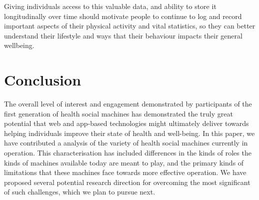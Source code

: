 \documentclass{sig-alternate}
\begin{document}
Giving individuals access to this valuable data, and ability to store
it longitudinally over time should motivate people to continue to log
and record important aspects of their physical activity and vital
statistics, so they can better understand their lifestyle and ways that
their behaviour impacts their general wellbeing.

\section{Conclusion}

The overall level of interest and engagement demonstrated by
participants of the first generation of health social machines has
demonstrated the truly great potential that web and app-based
technologies might ultimately deliver towards helping individuals
improve their state of health and well-being. In this paper, we have
contributed a analysis of the variety of health social machines
currently in operation.  This characterisation has included
differences in the kinds of roles the kinds of machines available
today are meant to play, and the primary kinds of limitations that
these machines face towards more effective operation.  We have
proposed several potential research direction for overcoming the most
significant of such challenges, which we plan to pursue next.



\end{document}
